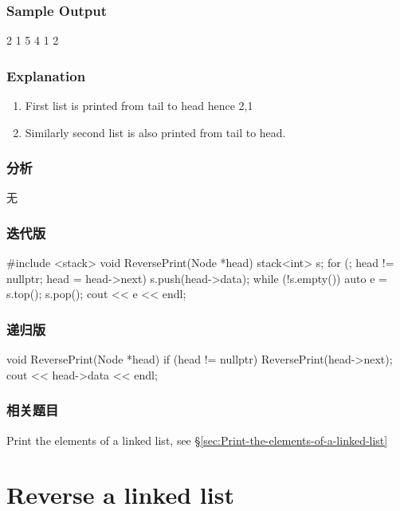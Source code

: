 \subsubsection{Sample Output}
\begin{Code}
2
1
5
4
1
2
\end{Code}


\subsubsection{Explanation}
\begin{enumerate}
\item First list is printed from tail to head hence 2,1
\item Similarly second list is also printed from tail to head.
\end{enumerate}


\subsubsection{分析}
无


\subsubsection{迭代版}
\begin{Code}
#include <stack>
void ReversePrint(Node *head) {
    stack<int> s;
    for (; head != nullptr; head = head->next) {
        s.push(head->data);
    }
    while (!s.empty()) {
        auto e = s.top();
        s.pop();
        cout << e << endl;
    }
}
\end{Code}


\subsubsection{递归版}
\begin{Code}
void ReversePrint(Node *head) {
    if (head != nullptr) {
        ReversePrint(head->next);
        cout << head->data << endl;
    }
}
\end{Code}


\subsubsection{相关题目}
\begindot
\item Print the elements of a linked list, see \S \ref{sec:Print-the-elements-of-a-linked-list}
\myenddot


\section{Reverse a linked list} %
\label{sec:Reverse-a-linked-list}

